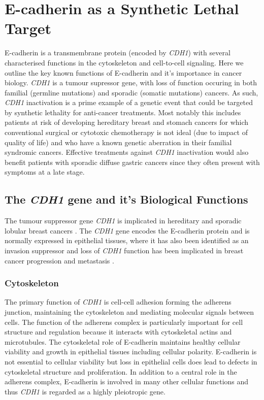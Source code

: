 
\section{E-cadherin as a Synthetic Lethal Target}

E-cadherin is a transmembrane protein (encoded by \textit{CDH1}) with several characterised functions in the cytoskeleton and cell-to-cell signaling. Here we outline the key known functions of E-cadherin and it's importance in cancer biology. \textit{CDH1} is a tumour supressor gene, with loss of function occuring in both familial (germline mutations) and sporadic (somatic mutations) cancers. As such, \textit{CDH1} inactivation is a prime example of a genetic event that could be targeted by synthetic lethality for anti-cancer treatments. Most notably this includes patients at risk of developing hereditary breast and stomach cancers for which conventional surgical or cytotoxic chemotherapy is not ideal (due to impact of quality of life) and who have a known genetic aberration in their familial syndromic cancers. Effective treatments against \textit{CDH1} inactivation would also benefit patients with sporadic diffuse gastric cancers since they often present with symptoms at a late stage.

\subsection{The \textit{CDH1} gene and it's Biological Functions}
The tumour suppressor gene \textit{CDH1} is implicated in hereditary and sporadic lobular breast cancers \citep{Berx1996,DeLeeuw1997,Berx2009,Vos1997,Semb1998,Masciari2007}. The \textit{CDH1} gene encodes the E-cadherin protein and is normally expressed in epithelial tissues, where it has also been identified as an invasion suppressor and loss of \textit{CDH1} function has been implicated in breast cancer progression and metastasis \citep{Berx1995,Becker1994,Christofori1999}.

\subsubsection{Cytoskeleton}
The primary function of \textit{CDH1} is cell-cell adhesion forming the adherens junction, maintaining the cytoskeleton and mediating molecular signals between cells. The function of the adherens complex is particularly important for cell structure and regulation because it interacts with cytoskeletal actins and microtubules. The cytoskeletal role of E-cadherin maintains healthy cellular viability and growth in epithelial tissues including cellular polarity. E-cadherin is not essential to cellular viability but loss in epithelial cells does lead to defects in cytoskeletal structure and proliferation. In addition to a central role in the adherens complex, E-cadherin is involved in many other cellular functions and thus \textit{CDH1} is regarded as a highly pleiotropic gene.

